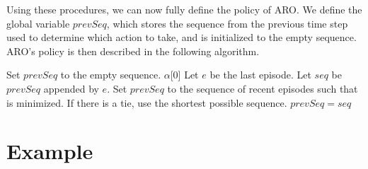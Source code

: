 \documentclass[letterpaper]{article} %
\begin{document}
Using these procedures, we can now fully define the policy of ARO. We
define the global variable $prevSeq$, which stores the sequence
from the previous time step used to determine which action to take,
and is initialized to the empty sequence. ARO's policy is then
described in the following algorithm.

\begin{algorithmic}[1]
			\State Set $prevSeq$ to the empty sequence.
			\State \Return $\alpha$[0]
		\EndIf
		\State Let $e$ be the last episode.
		\State Let $seq$ be $prevSeq$ appended by $e$.
			\State Set $prevSeq$ to the sequence of recent episodes such that  is minimized.
			\State If there is a tie, use the shortest possible sequence.
		\Else
			\State $prevSeq = seq$
		\EndIf
        \State \Return {}
	\EndFunction
	
\end{algorithmic}


\section{Example}
\end{document}
